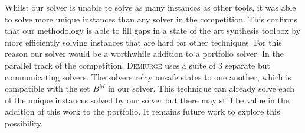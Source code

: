 Whilst our solver is unable to solve as many instances as other tools, it was
able to solve more unique instances than any solver in the competition. This
confirms that our methodology is able to fill gaps in a state of the art
synthesis toolbox by more efficiently solving instances that are hard for other
techniques. For this reason our solver would be a worthwhile addition to a
portfolio solver. In the parallel track of the competition, \textsc{Demiurge}
uses a suite of 3 separate but communicating solvers. The solvers
relay unsafe states to one another, which is compatible with the set $B^M$ in
our solver. This technique can already solve each of the unique instances
solved by our solver but there may still be value in the addition of this work
to the portfolio.  It remains future work to explore this possibility.

